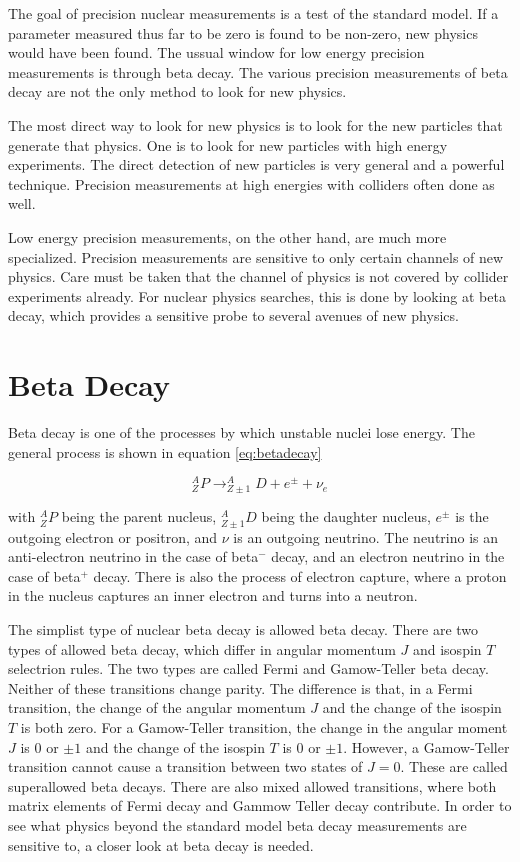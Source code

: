 \documentclass[main.tex]{subfiles}
\begin{document}
The goal of precision nuclear measurements is a test of the standard model.
If a parameter measured thus far to be zero is found to be non-zero, new physics would have been found. 
The ussual window for low energy precision measurements is through beta decay.
The various precision measurements of beta decay are not the only method to look for new physics.

The most direct way to look for new physics is to look for the new particles that generate that physics.
One is to look for new particles with high energy experiments. 
The direct detection of new particles is very general and a powerful technique.
Precision measurements at high energies with colliders often done as well. 
 
Low energy precision measurements, on the other hand, are much more specialized.
Precision measurements are sensitive to only certain channels of new physics.
Care must be taken that the channel of physics is not covered by collider experiments already.
For nuclear physics searches, this is done by looking at beta decay, which provides a sensitive probe to several avenues of new physics.

\section{Beta Decay}
Beta decay is one of the processes by which unstable nuclei lose energy.
The general process is shown in equation \ref{eq:betadecay}

\begin{equation}
	\label{eq:betadecay}
	^{A}_{Z}P \rightarrow ^{A}_{Z\pm 1}D + e^{\pm} + \nu_{e}
\end{equation}

with $^{A}_{Z}P$ being the parent nucleus, $^{A}_{Z \pm 1}D$ being the daughter nucleus, $e^{\pm}$ is the outgoing electron or positron, and $\nu$ is an outgoing neutrino.
The neutrino is an anti-electron neutrino in the case of beta$^{-}$ decay, and an electron neutrino in the case of beta$^{+}$ decay. 
There is also the process of electron capture, where a proton in the nucleus captures an inner electron and turns into a neutron.

The simplist type of nuclear beta decay is allowed beta decay.
There are two types of allowed beta decay, which differ in angular momentum $J$ and isospin $T$ selectrion rules.
The two types are called Fermi and Gamow-Teller beta decay. 
Neither of these transitions change parity.
The difference is that, in a Fermi transition, the change of the angular momentum $J$ and the change of the isospin $T$ is both zero.
For a Gamow-Teller transition, the change in the angular moment $J$ is $0$ or $\pm1$ and the change of the isospin $T$ is $0$ or $\pm 1$.
However, a Gamow-Teller transition cannot cause a transition between two states of $J = 0$. 
These are called superallowed beta decays.
There are also mixed allowed transitions, where both matrix elements of Fermi decay and Gammow Teller decay contribute.
In order to see what physics beyond the standard model beta decay measurements are sensitive to, a closer look at beta decay is needed.
\end{document}
